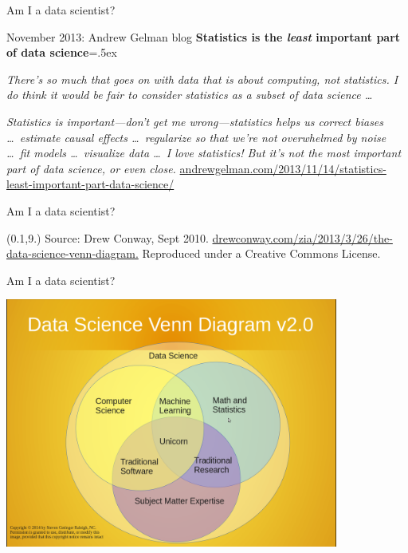 \documentclass[14pt]{beamer}
\def\inlinesource#1{\hbox{\fontsize{6}{8}\sffamily \url{#1}}}
\begin{document}
\begin{frame}{Am I a data scientist?}\fontsize{12.5}{15}\sffamily


\begin{alertblock}{November 2013: Andrew Gelman blog}
\textbf{Statistics is the \emph{least} important part of data science}\parskip=.5ex

\textit{There’s so much that goes on with data that is about computing, not statistics. I do think it would be fair to consider statistics as a subset of data science \dots}

\textit{Statistics is important—don’t get me wrong—statistics helps us correct biases \dots\ estimate causal effects \dots\  regularize so that we’re not overwhelmed by noise \dots\ fit models \dots\ visualize data \dots\ I love statistics! But it’s not the most important part of data science, or even close.}
\hfill\inlinesource{andrewgelman.com/2013/11/14/statistics-least-important-part-data-science/}
\end{alertblock}

\vspace*{10cm}

\end{frame}




\begin{frame}{Am I a data scientist?}

\begin{textblock}{12.8}(0.1,9.)\fontsize{5}{7}\sffamily
Source: Drew Conway, Sept 2010.  \url{drewconway.com/zia/2013/3/26/the-data-science-venn-diagram.} Reproduced under a Creative Commons License.
\end{textblock}
\end{frame}


\begin{frame}{Am I a data scientist?}\vspace*{-0.2cm}
\centerline{\includegraphics[height=8.2cm]{Venn-Diagram-of-Data-Scientist-Skills-}}
\end{frame}
\end{document}
